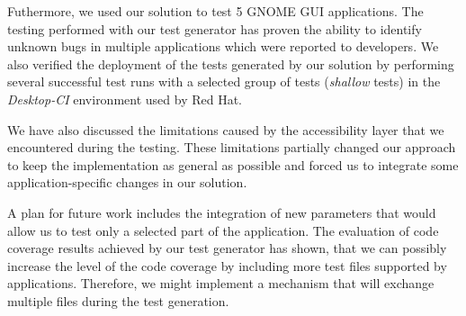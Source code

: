 Futhermore, we used our solution to test 5 GNOME GUI applications. The testing performed with our test generator has proven the ability to identify unknown bugs in multiple applications which were reported to developers. We also verified the deployment of the tests generated by our solution by performing several successful test runs with a selected group of tests (\textit{shallow} tests) in the \textit{Desktop-CI} environment used by Red Hat.

We have also discussed the limitations caused by the accessibility layer that we encountered during the testing. These limitations partially changed our approach to keep the implementation as general as possible and forced us to integrate some application-specific changes in our solution.

A plan for future work includes the integration of new parameters that would allow us to test only a selected part of the application. The evaluation of code coverage results achieved by our test generator has shown, that we can possibly increase the level of the code coverage by including more test files supported by applications. Therefore, we might implement a mechanism that will exchange multiple files during the test generation.  